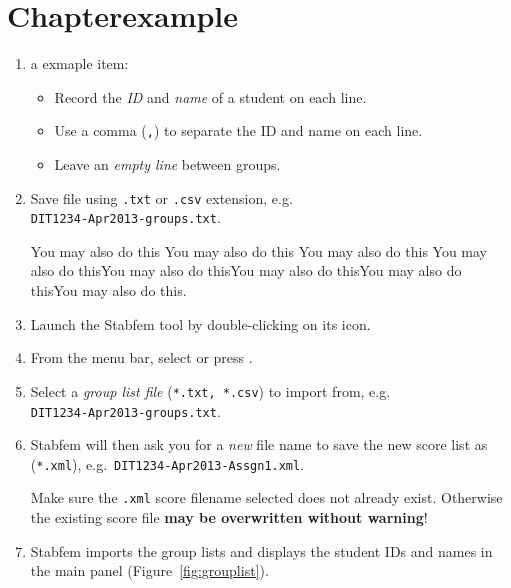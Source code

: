 \section{Chapterexample}

\begin{enumerate}
\item a exmaple item:

  \begin{itemize}[noitemsep]
  \item Record the \emph{ID} and \emph{name} of a student on each line.
  \item Use a comma (\texttt{,}) to separate the ID and name on each line.
  \item Leave an \emph{empty line} between groups.
  \end{itemize}
  
\item Save file using \texttt{.txt} or \texttt{.csv} extension, e.g.\\\texttt{DIT1234-Apr2013-groups.txt}.

\medskip

\begin{leftbar}
You may also do this You may also do this You may also do this You may also do thisYou may also do thisYou may also do thisYou may also do thisYou may also do this.
\end{leftbar}




\item Launch the Stabfem tool by double-clicking on its icon.
\item From the menu bar, select  or press .
\item Select a \emph{group list file} (\texttt{*.txt, *.csv}) to import from, e.g.\\\texttt{DIT1234-Apr2013-groups.txt}.
\item Stabfem will then ask you for a \emph{new} file name to save the new score list as (\texttt{*.xml}), e.g.~\texttt{DIT1234-Apr2013-Assgn1.xml}.

\medskip

\begin{leftbar}
Make sure the \texttt{.xml} score filename selected does not already exist. Otherwise the existing score file \textbf{may be overwritten without warning}!
\end{leftbar}

\medskip

\item Stabfem imports the group lists and displays the student IDs and names in the main panel (Figure~\ref{fig:grouplist}).


\end{enumerate}

